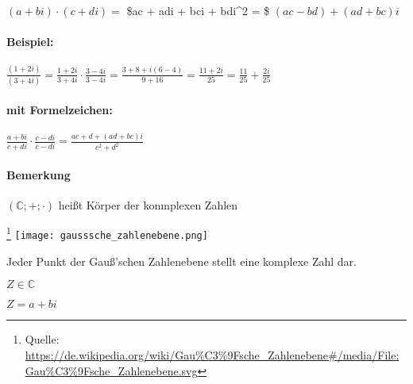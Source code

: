 \documentclass{../tudscript}
\begin{document}
\((a + bi) \cdot (c + di) =\) \$ac + adi + bci + bdi\^{}2 = \$
\((ac - bd) + (ad + bc)i\)

\hypertarget{division}{%
\label{division}}

\hypertarget{beispiel-1}{%
\paragraph{Beispiel:}\label{beispiel-1}}

\(\frac{(1+2i)}{(3+4i)} = \frac{1+2i}{3+4i} \cdot \frac{3-4i}{3-4i} = \frac{3+8+i(6-4)}{9+16} = \frac{11+2i}{25} = \frac{11}{25} + \frac{2i}{25}\)

\hypertarget{mit-formelzeichen-3}{%
\paragraph{mit Formelzeichen:}\label{mit-formelzeichen-3}}

\(\frac{a + bi}{c + di} \cdot \frac{c - di}{c - di} = \frac{ac + d + (ad + bc)i}{c^{2} + d^{2}}\)

\hypertarget{bemerkung}{%
\paragraph{Bemerkung}\label{bemerkung}}

\((\mathbb{C};+;\cdot)\) heißt Körper der konmplexen Zahlen

\hypertarget{gauuxdfsche-zahlenebene}{%
\label{gauuxdfsche-zahlenebene}}

\footnote{Quelle:
  \url{https://de.wikipedia.org/wiki/Gau\%C3\%9Fsche_Zahlenebene\#/media/File:Gau\%C3\%9Fsche_Zahlenebene.svg}}
\texttt{[image: gausssche\_zahlenebene.png]}

Jeder Punkt der Gauß'schen Zahlenebene stellt eine komplexe Zahl dar.

\hypertarget{darstellungsformen-komplexer-zahlen}{%
\label{darstellungsformen-komplexer-zahlen}}

\(Z \in \mathbb{C}\)

\hypertarget{arithmetischekartesiche-darstellung}{%
\label{arithmetischekartesiche-darstellung}}

\(Z = a + bi\)

\hypertarget{trigonometrische-darstellungpolarkoordinaten}{%
\label{trigonometrische-darstellungpolarkoordinaten}}
\end{document}
